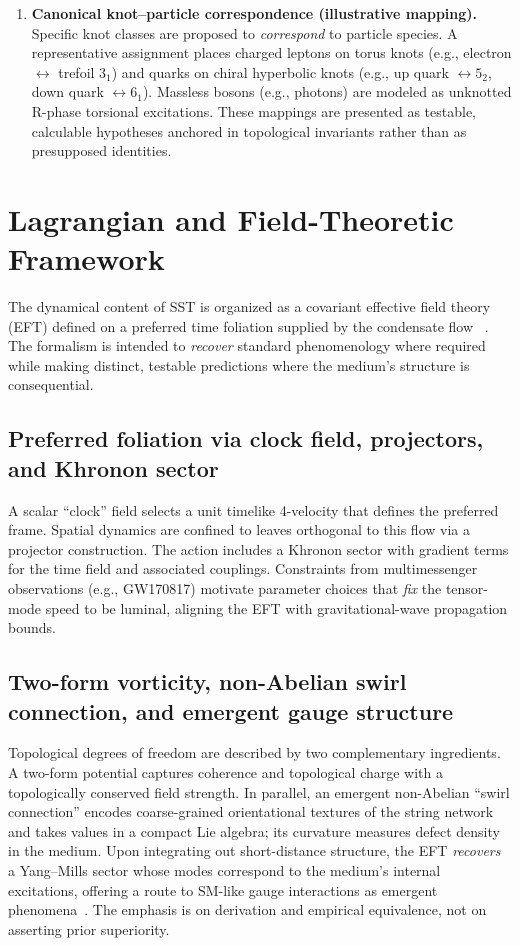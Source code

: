 \documentclass[10pt,reprint,aps,onecolumn,nofootinbib]{revtex4-2}
\begin{document}
\begin{enumerate}
            \item \textbf{Canonical knot–particle correspondence (illustrative mapping).} Specific knot classes are proposed to \emph{correspond} to particle species. A representative assignment places charged leptons on torus knots (e.g., electron $\leftrightarrow$ trefoil $3_1$) and quarks on chiral hyperbolic knots (e.g., up quark $\leftrightarrow 5_2$, down quark $\leftrightarrow 6_1$). Massless bosons (e.g., photons) are modeled as unknotted R-phase torsional excitations. These mappings are presented as testable, calculable hypotheses anchored in topological invariants rather than as presupposed identities.
            \end{enumerate}

    \section{Lagrangian and Field-Theoretic Framework}\label{sec:lagrangian}
        The dynamical content of SST is organized as a covariant effective field theory (EFT) defined on a preferred time foliation supplied by the condensate flow~ \cite{sstLagrangian}. The formalism is intended to \emph{recover} standard phenomenology where required while making distinct, testable predictions where the medium’s structure is consequential.

        \subsection*{Preferred foliation via clock field, projectors, and Khronon sector}
            A scalar ``clock'' field selects a unit timelike 4-velocity that defines the preferred frame. Spatial dynamics are confined to leaves orthogonal to this flow via a projector construction. The action includes a Khronon sector with gradient terms for the time field and associated couplings. Constraints from multimessenger observations (e.g., GW170817) motivate parameter choices that \emph{fix} the tensor-mode speed to be luminal, aligning the EFT with gravitational-wave propagation bounds.

        \subsection*{Two-form vorticity, non-Abelian swirl connection, and emergent gauge structure}
            Topological degrees of freedom are described by two complementary ingredients. A two-form potential captures coherence and topological charge with a topologically conserved field strength. In parallel, an emergent non-Abelian ``swirl connection'' encodes coarse-grained orientational textures of the string network and takes values in a compact Lie algebra; its curvature measures defect density in the medium. Upon integrating out short-distance structure, the EFT \emph{recovers} a Yang–Mills sector whose modes correspond to the medium’s internal excitations, offering a route to SM-like gauge interactions as emergent phenomena~\cite{sstCanon,sstLagrangian}. The emphasis is on derivation and empirical equivalence, not on asserting prior superiority.
\end{document}
